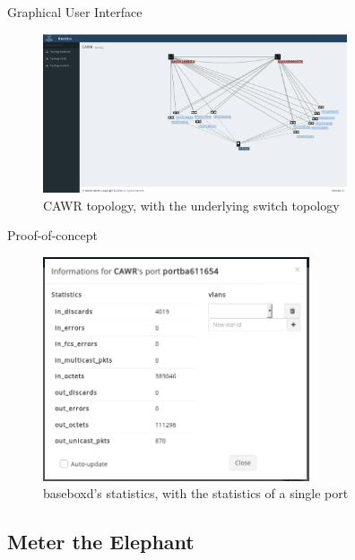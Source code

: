 \documentclass[aspectratio=43]{beamer}
\begin{document}
\begin{frame}{Graphical User Interface}
    \begin{figure}[!tbph]
      \centering
      \includegraphics[width=0.8\textwidth]{bisdn/cawr_gui}
      \caption {CAWR topology, with the underlying switch topology}
    \end{figure}
\end{frame}

\begin{frame}{Proof-of-concept}
    \begin{figure}[!tbph]
      \centering
      \includegraphics[width=0.7\textwidth]{bisdn/basebox_gui}
      \caption {baseboxd's statistics, with the statistics of a single port}
    \end{figure}
\end{frame}

\subsection{Meter the Elephant}
\end{document}
